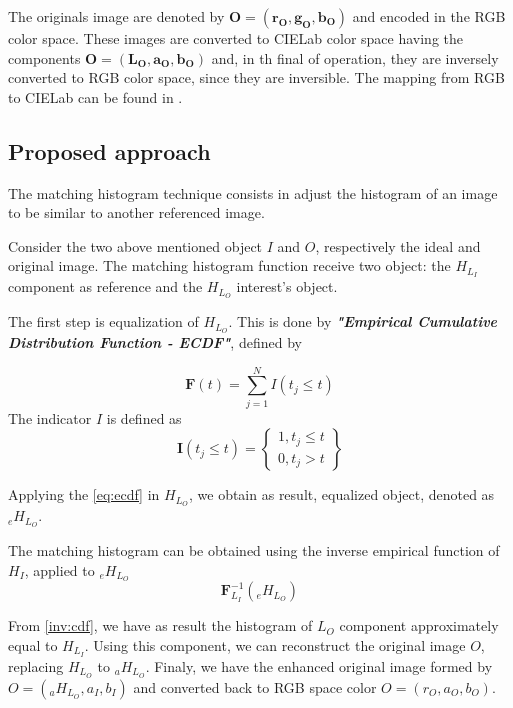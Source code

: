 \documentclass{article}
\begin{document}
The originals image are denoted by $\bm {O=(r_O, g_O, b_O)}$ and encoded in the RGB color space. These images are converted to CIELab color space having the components $\bm{O=(L_O, a_O, b_O)}$ and, in th final of operation, they are inversely converted to RGB color space, since they are inversible. The mapping from RGB to CIELab can be found in \citep{AssessingInformationContentinColorImages}. 

\subsection{Proposed approach}
\label{match}
The matching histogram technique consists in adjust the histogram of an image to be similar to another referenced image.

Consider the two above mentioned object $I$ and $O$, respectively the ideal and original image. The matching histogram function receive two object: the $H_{L_I}$ component as reference and the $H_{L_O}$ interest's object. 

The first step is equalization of $H_{L_O}$. This is done by \textbf{\textit{"Empirical Cumulative Distribution Function - ECDF"}}, defined by 

\begin{equation}
    \bm F(t) = \sum_{j=1}^N I(t_j \leq t) 
    \label{eq:ecdf}
\end{equation}
The indicator $I$ is defined as
\begin{equation}
    \bm I(t_j \leq t) = \begin{Bmatrix}
        1,  t_j \leq t \\
        0,  t_j > t
    \end{Bmatrix}
\end{equation}

Applying the \ref{eq:ecdf} in $H_{L_O}$, we obtain as result, equalized object, denoted as $_eH_{L_O}$. 

The matching histogram can be obtained using the inverse empirical function of $H_I$, applied to $_eH_{L_O}$
\begin{equation}
    \bm F^{-1}_{L_I}(_eH_{L_O})
    \label{inv:cdf}
\end{equation}

From \ref{inv:cdf}, we have as result the histogram of $L_O$ component approximately equal to $H_{L_I}$. Using this component, we can reconstruct the original image $O$, replacing $H_{L_O}$ to $_aH_{L_O}$. Finaly, we have the enhanced original image formed by $O = (_aH_{L_O}, a_I, b_I)$ and converted back to RGB space color $O = (r_O, a_O, b_O)$.
\end{document}
